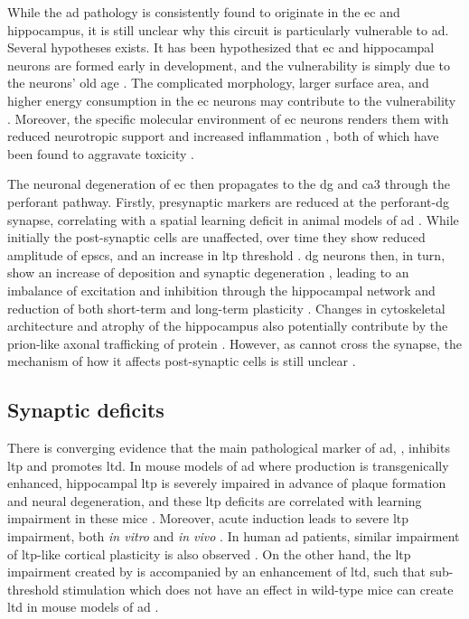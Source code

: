 While the \gls{ad} pathology is consistently found to originate in the \gls{ec} and hippocampus, it is still unclear why this circuit is particularly vulnerable to \gls{ad}. Several hypotheses exists. It has been hypothesized that \gls{ec} and hippocampal neurons are formed early in development, and the vulnerability is simply due to the neurons' old age \citep{rakic81}. The complicated morphology, larger surface area, and higher energy consumption in the \gls{ec} neurons may contribute to the vulnerability \citep{hevner92, buckmaster04}. Moreover, the specific molecular environment of \gls{ec} neurons renders them with reduced neurotropic support \citep{narisawa-saito96, peterson96} and increased inflammation \citep{janelsins05, okun10}, both of which have been found to aggravate \abeta{} toxicity \citep{tang08, stranahan10}.

The neuronal degeneration of \gls{ec} then propagates to the \gls{dg} and \gls{ca3} through the perforant pathway. Firstly, presynaptic markers are reduced at the perforant-\gls{dg} synapse, correlating with a spatial learning deficit in animal models of \gls{ad} \citep{smith00}. While initially the post-synaptic cells are unaffected, over time they show reduced amplitude of \glspl{epsc}, and an increase in \gls{ltp} threshold \citep{calhoun08, barnes80, barnes00}. \Gls{dg} neurons then, in turn, show an increase of \abeta{} deposition and synaptic degeneration \citep{reilly03, dong07}, leading to an imbalance of excitation and inhibition through the hippocampal network and reduction of both short-term and long-term plasticity \citep{palop07}. Changes in cytoskeletal architecture and atrophy of the hippocampus also potentially contribute by the prion-like axonal trafficking of \atau{} protein \citep{clavaguera09}. However, as \atau{} cannot cross the synapse, the mechanism of how it affects post-synaptic cells is still unclear \citep{stranahan10}.  

\subsection{Synaptic deficits \label{ad.synaptic}}

There is converging evidence that the main pathological marker of \gls{ad}, \abeta{}, inhibits \gls{ltp} and promotes \gls{ltd}. In mouse models of \gls{ad} where \abeta{} production is transgenically enhanced, hippocampal \gls{ltp} is severely impaired in advance of plaque formation and neural degeneration, and these \gls{ltp} deficits are correlated with learning impairment in these mice \citep{hsia99, chapman99, roberson11}. Moreover, acute \abeta{} induction leads to severe \gls{ltp} impairment, both \textit{in vitro} \citep{lambert98, shankar08} and \textit{in vivo} \citep{walsh02, hu08}. In human \gls{ad} patients, similar impairment of \gls{ltp}-like cortical plasticity is also observed \citep{inghilleri06, koch12}. On the other hand, the \gls{ltp} impairment created by \abeta{} is accompanied by an enhancement of \gls{ltd}, such that sub-threshold stimulation which does not have an effect in wild-type mice can create \gls{ltd} in mouse models of \gls{ad} \citep{hsia99, fitzjohn01, jacobsen06}. 

